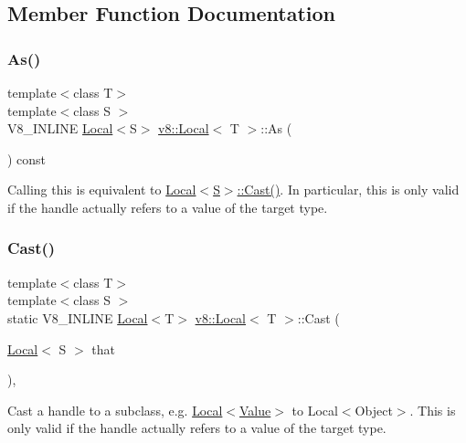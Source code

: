 \subsection{Member Function Documentation}
\mbox{\label{classv8_1_1Local_afa242d21780a729341644a615c4e6ea1}} 
\subsubsection{\texorpdfstring{As()}{As()}}
{\footnotesize\ttfamily template$<$class T$>$ \\
template$<$class S $>$ \\
V8\+\_\+\+I\+N\+L\+I\+NE \mbox{\hyperlink{classv8_1_1Local}{Local}}$<$S$>$ \mbox{\hyperlink{classv8_1_1Local}{v8\+::\+Local}}$<$ T $>$\+::As (\begin{DoxyParamCaption}{ }\end{DoxyParamCaption}) const\hspace{0.3cm}{\ttfamily [inline]}}

Calling this is equivalent to \mbox{\hyperlink{classv8_1_1Local_a95c8aa28ad098dd160ddd8cb60377bd6}{Local$<$\+S$>$\+::\+Cast()}}. In particular, this is only valid if the handle actually refers to a value of the target type. \mbox{\label{classv8_1_1Local_a95c8aa28ad098dd160ddd8cb60377bd6}} 
\subsubsection{\texorpdfstring{Cast()}{Cast()}}
{\footnotesize\ttfamily template$<$class T$>$ \\
template$<$class S $>$ \\
static V8\+\_\+\+I\+N\+L\+I\+NE \mbox{\hyperlink{classv8_1_1Local}{Local}}$<$T$>$ \mbox{\hyperlink{classv8_1_1Local}{v8\+::\+Local}}$<$ T $>$\+::Cast (\begin{DoxyParamCaption}\item[{\mbox{\hyperlink{classv8_1_1Local}{Local}}$<$ S $>$}]{that }\end{DoxyParamCaption})\hspace{0.3cm}{\ttfamily [inline]}, {\ttfamily [static]}}

Cast a handle to a subclass, e.\+g. \mbox{\hyperlink{classv8_1_1Local}{Local$<$\+Value$>$}} to Local$<$\+Object$>$. This is only valid if the handle actually refers to a value of the target type. \mbox{\label{classv8_1_1Local_a6fcf63af6bdd697ddd7c3acd16c69899}} 
